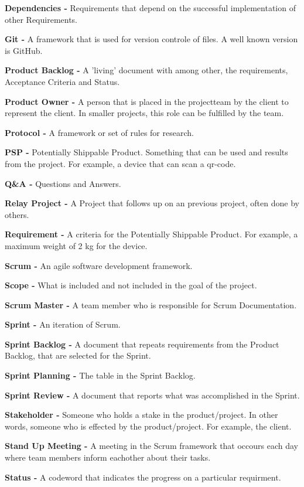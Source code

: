 \documentclass[10pt]{report}
\begin{document}
\textbf{Dependencies -} Requirements that depend on the successful implementation of other Requirements.

\textbf{Git -} A framework that is used for version controle of files. A well known version is GitHub.

\textbf{Product Backlog -} A 'living' document with among other, the requirements, Acceptance Criteria and Status.

\textbf{Product Owner -} A person that is placed in the projectteam by the client to represent the client. In smaller projects, this role can be fulfilled by the team.

\textbf{Protocol -} A framework or set of rules for research.

\textbf{PSP -} Potentially Shippable Product. Something that can be used and results from the project. For example, a device that can scan a qr-code.

\textbf{Q\&A -} Questions and Answers.

\textbf{Relay Project -} A Project that follows up on an previous project, often done by others.

\textbf{Requirement -} A criteria for the Potentially Shippable Product. For example, a maximum weight of 2 kg for the device.

\textbf{Scrum -} An agile software development framework.

\textbf{Scope -} What is included and not included in the goal of the project.

\textbf{Scrum Master -} A team member who is responsible for Scrum Documentation.

\textbf{Sprint -} An iteration of Scrum.

\textbf{Sprint Backlog -} A document that repeats requirements from the Product Backlog, that are selected for the Sprint.

\textbf{Sprint Planning -} The table in the Sprint Backlog.

\textbf{Sprint Review -} A document that reports what was accomplished in the Sprint.

\textbf{Stakeholder -} Someone who holds a stake in the product/project. In other words, someone who is effected by the product/project. For example, the client.

\textbf{Stand Up Meeting -} A meeting in the Scrum framework that occours each day where team members inform eachother about their tasks.

\textbf{Status -} A codeword that indicates the progress on a particular requirment.
\end{document}
